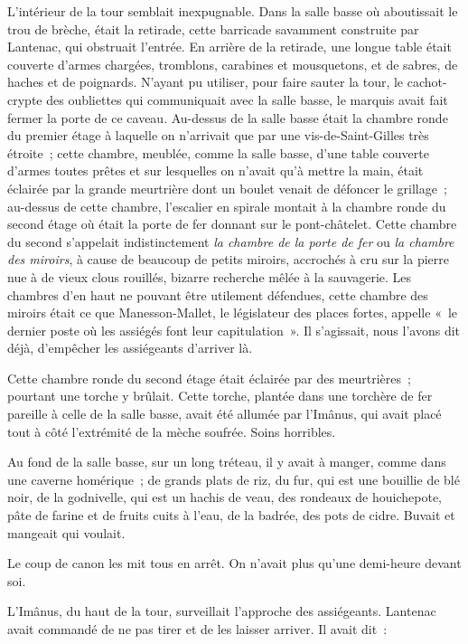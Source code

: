 \documentclass[french,twoside]{book} %
\begin{document}
L’intérieur de la tour semblait inexpugnable. Dans la salle basse où aboutissait le trou de brèche, était la retirade, cette barricade savamment construite par  Lantenac, qui obstruait l’entrée. En arrière de la retirade, une longue table était couverte d’armes chargées, tromblons, carabines et mousquetons, et de sabres, de haches et de poignards. N’ayant pu utiliser, pour faire sauter la tour, le cachot-crypte des oubliettes qui communiquait avec la salle basse, le marquis avait fait fermer la porte de ce caveau. Au-dessus de la salle basse était la chambre ronde du premier étage à laquelle on n’arrivait que par une vis-de-Saint-Gilles très étroite ; cette chambre, meublée, comme la salle basse, d’une table couverte d’armes toutes prêtes et sur lesquelles on n’avait qu’à mettre la main, était éclairée par la grande meurtrière dont un boulet venait de défoncer le grillage ; au-dessus de cette chambre, l’escalier en spirale montait à la chambre ronde du second étage où était la porte de fer donnant sur le pont-châtelet. Cette chambre du second s’appelait indistinctement \emph{la chambre de la porte de fer} ou \emph{la chambre des miroirs}, à cause de beaucoup de petits miroirs, accrochés à cru sur la pierre nue à de vieux clous rouillés, bizarre recherche mêlée à la sauvagerie. Les chambres d’en haut ne pouvant être utilement défendues, cette chambre des miroirs était ce que Manesson-Mallet, le législateur des places fortes, appelle « le dernier poste où les assiégés font leur capitulation ». Il s’agissait, nous l’avons dit déjà, d’empêcher les assiégeants d’arriver là.\par
Cette chambre ronde du second étage était éclairée par des meurtrières ; pourtant une torche y brûlait. Cette torche, plantée dans une torchère de fer pareille  à celle de la salle basse, avait été allumée par l’Imânus, qui avait placé tout à côté l’extrémité de la mèche soufrée. Soins horribles.\par
Au fond de la salle basse, sur un long tréteau, il y avait à manger, comme dans une caverne homérique ; de grands plats de riz, du fur, qui est une bouillie de blé noir, de la godnivelle, qui est un hachis de veau, des rondeaux de houichepote, pâte de farine et de fruits cuits à l’eau, de la badrée, des pots de cidre. Buvait et mangeait qui voulait.\par
Le coup de canon les mit tous en arrêt. On n’avait plus qu’une demi-heure devant soi.\par
L’Imânus, du haut de la tour, surveillait l’approche des assiégeants. Lantenac avait commandé de ne pas tirer et de les laisser arriver. Il avait dit :\par
\end{document}
